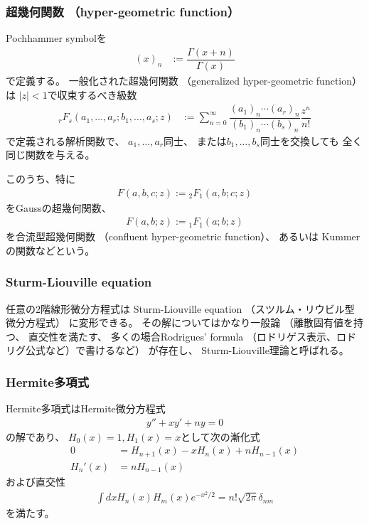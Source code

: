 \subsubsection{超幾何関数
    （hyper-geometric function）
}

Pochhammer symbolを
\begin{align}
    (x)_n
    &:=
    \dfrac{\Gamma(x+n)}{\Gamma(x)}
\end{align}
で定義する。
一般化された超幾何関数
（generalized hyper-geometric function）は
$|z| < 1$で収束するべき級数
\begin{align}
    {}_r F_s
    (
        a_1, \dots, a_r;
        b_1, \dots, a_s;
        z
    )
    &:=
    \sum_{n=0}^{\infty}
    \dfrac{ (a_1)_n \cdots (a_r)_n }{
      (b_1)_n \cdots (b_s)_n
    }
    \dfrac{z^n}{n!}  
\end{align}
で定義される解析関数で、
$a_1, \dots, a_r$同士、
または$b_1, \dots, b_s$同士を交換しても
全く同じ関数を与える。

このうち、特に
\begin{align}
    F(a, b, c; z)
    :=
    {}_2 F_1 (a, b; c; z)
\end{align}
をGaussの超幾何関数、
\begin{align}
    F(a, b; z)
    :=
    {}_1 F_1(a; b; z)
\end{align}
を合流型超幾何関数
（confluent hyper-geometric function）、
あるいは
Kummerの関数などという。

\subsubsection{Sturm-Liouville equation}

任意の$2$階線形微分方程式は
Sturm-Liouville equation
（スツルム・リウビル型微分方程式）
に変形できる。
その解についてはかなり一般論
（離散固有値を持つ、
直交性を満たす、
多くの場合Rodrigues' formula
（ロドリゲス表示、ロドリグ公式など）で書けるなど）
が存在し、
Sturm-Liouville理論と呼ばれる。

\subsubsection{Hermite多項式}
\label{hermite polynomial}

Hermite多項式はHermite微分方程式
\begin{align}
    y'' + x y' + n y = 0
\end{align}
の解であり、
$H_0(x) = 1, H_1(x) = x$として次の漸化式
\begin{subequations}
\begin{align}
    0
    &=
    H_{n+1}(x)
    -
    x H_n(x)
    +
    n H_{n-1}(x)
\\
    H_n'(x)
    &=
    n H_{n-1}(x)
\end{align}
\label{hermite polynomial recurrence relation}
\end{subequations}
および直交性
\begin{align}
    \int dx H_n(x) H_m(x) e^{-x^2/2}
    =
    n! \sqrt{2 \pi}
    \delta_{nm}
\label{normality of hermite polynomial}
\end{align}
を満たす。

